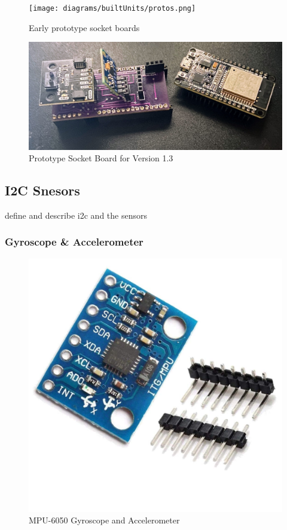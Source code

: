 \begin{figure}
    \centering
    \texttt{[image: diagrams/builtUnits/protos.png]}
    \caption{Early prototype socket boards}
    \label{fig:protoBoard}
\end{figure}


\begin{figure}
    \centering
    \includegraphics[scale=0.15]{diagrams/builtUnits/protoBoard.JPG}
    \caption{Prototype Socket Board for Version 1.3}
    \label{fig:protoBoard2}
\end{figure}


\subsection{I2C Snesors}

define and describe i2c and the sensors

\subsubsection{Gyroscope \& Accelerometer}

\begin{center}
    \begin{figure}
        \centering
        \includegraphics[scale=0.2]{diagrams/oem/6050.jpg}
        \caption{MPU-6050 Gyroscope and Accelerometer}
        \label{fig:6050}
    \end{figure}
\end{center}



